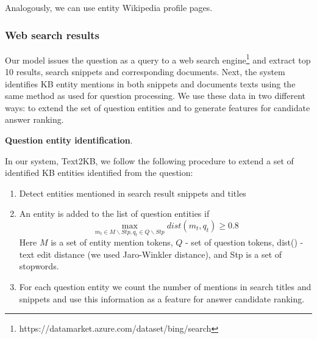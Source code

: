 Analogously, we can use entity Wikipedia profile pages.

\subsubsection{Web search results}
\label{section:method:web}

Our model issues the question as a query to a web search engine\footnote{https://datamarket.azure.com/dataset/bing/search} and extract top 10 results, \ie search snippets and corresponding documents.
Next, the system identifies KB entity mentions in both snippets and documents texts using the same method as used for question processing.
We use these data in two different ways: to extend the set of question entities and to generate features for candidate answer ranking.

\textbf{Question entity identification}.

In our system, Text2KB, we follow the following procedure to extend a set of identified KB entities identified from the question:
\begin{enumerate}
\item Detect entities mentioned in search result snippets and titles
\item An entity is added to the list of question entities if 
$$\max_{m_t \in M\backslash Stp, q_t \in Q\backslash Stp} dist(m_t, q_t) \geq 0.8$$
Here $M$ is a set of entity mention tokens, $Q$ - set of question tokens, dist() - text edit distance (we used Jaro-Winkler distance), and Stp is a set of stopwords.
\item For each question entity we count the number of mentions in search titles and snippets and use this information as a feature for answer candidate ranking.
\end{enumerate}

